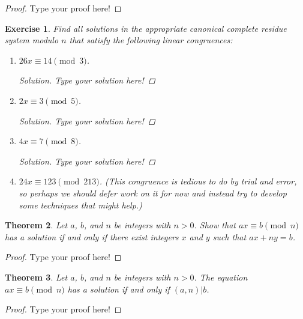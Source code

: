 \documentclass[11pt,leqno]{article}
\newtheorem{thm}{Theorem}[section]
\newtheorem{exer}[thm]{Exercise}
\theoremstyle{definition}
\begin{document}
\begin{proof}[Proof]
Type your proof here!
\end{proof}



\begin{exer}
Find all solutions in the appropriate canonical complete residue
system modulo $n$ that satisfy the following linear congruences:
\begin{enumerate}
\item $26x \equiv 14 \pmod{3}$.
\begin{proof}[Solution]
Type your solution here!
\end{proof}
\item $2x \equiv 3 \pmod{5}$.
\begin{proof}[Solution]
Type your solution here!
\end{proof}
\item $4x \equiv 7 \pmod{8}$.
\begin{proof}[Solution]
Type your solution here!
\end{proof}
\item $24x \equiv 123 \pmod{213}$. (This congruence is tedious to do by
trial and error, so perhaps we should defer work on it for now and
instead try to develop some techniques that might help.)
\end{enumerate}
\end{exer}

\begin{thm}
Let $a$, $b$, and $n$ be integers with $n > 0$.  Show that $ax
\equiv b \pmod{n}$ has a solution if and only if there exist
integers $x$ and $y$ such that $ax + ny = b$.
\end{thm}
\begin{proof}[Proof]
Type your proof here!
\end{proof}

\begin{thm}
Let $a$, $b$, and $n$ be integers with $n > 0$. The equation $ax
\equiv b \pmod{n}$ has a solution if and only if $(a, n)|b$.
\end{thm}

\begin{proof}[Proof]
Type your proof here!
\end{proof}
\end{document}
